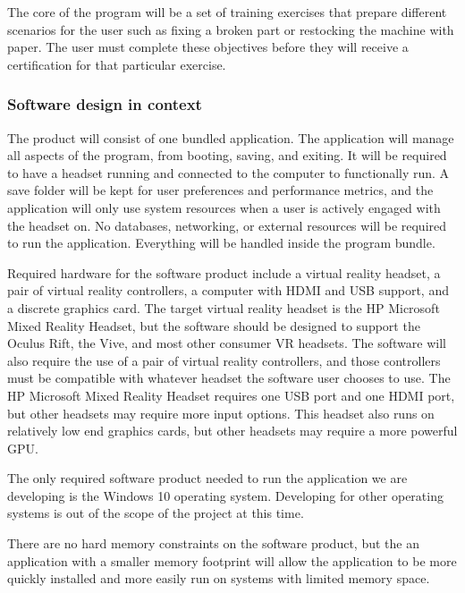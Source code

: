 \documentclass[onecolumn, draftclsnofoot,10pt, compsoc]{IEEEtran}
\begin{document}
The core of the program will be a set of training exercises that prepare different scenarios for the user such as fixing a broken part or restocking the machine with paper. The user must complete these objectives before they will receive a certification for that particular exercise.
\subsubsection{Software design in context}
The product will consist of one bundled application. The application will manage all aspects of the program, from booting, saving, and exiting. It will be required to have a headset running and connected to the computer to functionally run. A save folder will be kept for user preferences and performance metrics, and the application will only use system resources when a user is actively engaged with the headset on. No databases, networking, or external resources will be required to run the application. Everything will be handled inside the program bundle.

Required hardware for the software product include a virtual reality headset, a pair of virtual reality controllers, a computer with HDMI and USB support, and a discrete graphics card. The target virtual reality headset is the HP Microsoft Mixed Reality Headset, but the software should be designed to support the Oculus Rift, the Vive, and most other consumer VR headsets. The software will also require the use of a pair of virtual reality controllers, and those controllers must be compatible with whatever headset the software user chooses to use. The HP Microsoft Mixed Reality Headset requires one USB port and one HDMI port, but other headsets may require more input options. This headset also runs on relatively low end graphics cards, but other headsets may require a more powerful GPU. 

The only required software product needed to run the application we are developing is the Windows 10 operating system. Developing for other operating systems is out of the scope of the project at this time. 

There are no hard memory constraints on the software product, but the an application with a smaller memory footprint will allow the application to be more quickly installed and more easily run on systems with limited memory space. 
\end{document}
